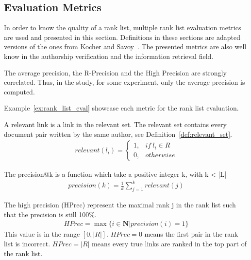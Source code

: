 \subsection{Evaluation Metrics \label{sec:rl_eval}}

In order to know the quality of a rank list, multiple rank list evaluation metrics are used and presented in this section.
Definitions in these sections are adapted versions of the ones from Kocher and Savoy~\cite{kocher_linking}.
The presented metrics are also well know in the authorship verification and the information retrieval field.

The average precision, the R-Precision and the High Precision are strongly correlated.
Thus, in the study, for some experiment, only the average precision is computed.

Example~\ref{ex:rank_list_eval} showcase each metric for the rank list evaluation.

\begin{definition}
  A relevant link is a link in the relevant set.
  The relevant set contains every document pair written by the same author, see Definition~\ref{def:relevant_set}.
  \begin{gather*}
    relevant(l_i) =
    \begin{cases}
      1, & if\ l_i \in R \\
      0, & otherwise
    \end{cases}
  \end{gather*}
\end{definition}

\begin{definition}
  The precision@k is a function which take a positive integer k, with k < |L|
  \begin{gather*}
    precision(k) = \frac{1}{k} \sum_{j=1}^{k} relevant(j)
  \end{gather*}
\end{definition}

\begin{definition}
  The high precision (HPrec) represent the maximal rank j in the rank list such that the precision is still 100\%.
  \begin{gather*}
    HPrec = \max\{i \in \mathbf{N} | precision(i) = 1\}
  \end{gather*}
  This value is in the range $\left[0, |R|\right]$.
  $HPrec=0$ means the first pair in the rank list is incorrect.
  $HPrec=|R|$ means every true links are ranked in the top part of the rank list.
\end{definition}

